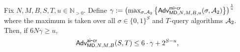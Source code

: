 \begin{lemma}%
\label{lem:nu2ai}
Fix $N,M,B,S,T,u\in \mathbb{N}_{>0}$. Define $
\gamma :=  \left(\max_{\sigma,\mathcal{A}_2} \left\{\mathsf{Adv}^{{\mathsf{mi}\mbox{-}\mathsf{cr}}}_{\mathsf{MD},N,M,B,u} (\sigma, \mathcal{A}_2) \right\}\right)^{\frac{1}{u}}$ where the maximum is taken over all $\sigma\in \{0,1\}^S$ and $T$-query algorithms $\mathcal{A}_2$. Then, if $6N\gamma\geq u$,
\begin{align*}
\mathsf{Adv}_{\mathsf{MD},N,M,B}^{{\mathsf{ai}\mbox{-}\mathsf{cr}}}(S,T)  \le 6\cdot   \gamma + 2^{S-u},
\end{align*}
\end{lemma}
\newcommand{\lemmaone}{
\begin{proof}

\ifnum\eprintversion=0
\constructiveChernoffPrlims
\fi 

Define 
\begin{align*}
\gamma :=  \left(\max_{\sigma,\advA_2} \left\{\Adv^{\uaicr}_{\MD,N,M,B,u} (\sigma, \advA_2) \right\}\right)^{\frac{1}{u}}.
\end{align*}

We need to upper bound $\Pr_{h,a}\left[{\AICR_{h,a}(\advA)}=\true\right]$ for every $(S,T)$-AI adversary $\advA$. %
We say that $h$ is \emph{easy} for adversary $\advA = (\advA_1,\advA_2)$ if $\advA$ wins the $\AICR_{h,a}$ game on a random $a\getsr[N]$ with probability $6\gamma$. That is, 
\begin{align*}
h \text{ is easy for } \advA \Longleftrightarrow \Pr_{a\getsr [N]}\left[\AICR_{h,a}(\advA) = \true\right]\geq 6\gamma .
\end{align*}


\end{proof}}
